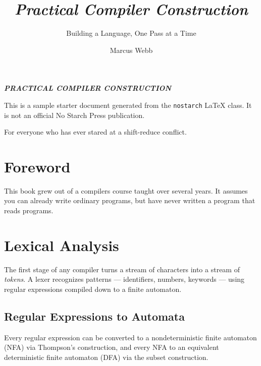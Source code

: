 \documentclass[nocfonts]{nostarch}
\begin{document}
\frontmatter

\author{Marcus Webb}
\nostarchlocation{}

\title{\emph{Practical Compiler Construction}}

\subtitle{Building a Language, One Pass at a Time}

\makehalftitle

\maketitle

\begin{copyrightpage}
\textbf{\sffamily\MakeUppercase{\emph{Practical Compiler Construction}}}

This is a sample starter document generated from the \texttt{nostarch}
\LaTeX{} class. It is not an official No Starch Press publication.
\end{copyrightpage}

\begin{dedicationpage}
For everyone who has ever stared at a shift-reduce conflict.
\end{dedicationpage}

\tableofcontents

\chapter*{Foreword}
This book grew out of a compilers course taught over several years. It
assumes you can already write ordinary programs, but have never
written a program that reads programs.

\mainmatter

\chapter{Lexical Analysis}
\label{ch:lexer}

The first stage of any compiler turns a stream of characters into a
stream of \emph{tokens}. A lexer recognizes
patterns — identifiers, numbers, keywords — using regular expressions
compiled down to a finite automaton.

\section{Regular Expressions to Automata}

Every regular expression can be converted to a nondeterministic finite
automaton (NFA) via Thompson's
construction, and every NFA to an equivalent deterministic finite
automaton (DFA) via the subset
construction.
\end{document}
